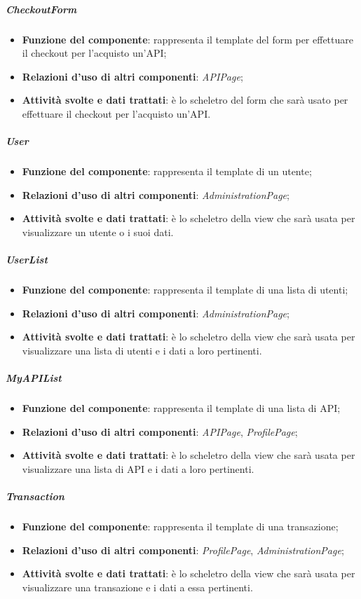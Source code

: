 \subparagraph{CheckoutForm}
\begin{itemize}
	\item \textbf{Funzione del componente}: rappresenta il template del form per effettuare il checkout per l'acquisto un'API;
	\item \textbf{Relazioni d’uso di altri componenti}: \textit{APIPage};
	\item \textbf{Attività svolte e dati trattati}: \`{e} lo scheletro del form che sar\`{a} usato per effettuare il checkout per l'acquisto un'API.
\end{itemize}

\subparagraph{User}
\begin{itemize}
	\item \textbf{Funzione del componente}: rappresenta il template di un utente;
	\item \textbf{Relazioni d’uso di altri componenti}: \textit{AdministrationPage};
	\item \textbf{Attività svolte e dati trattati}: \`{e} lo scheletro della view che sar\`{a} usata per visualizzare un utente o i suoi dati.
\end{itemize}

\subparagraph{UserList}
\begin{itemize}
	\item \textbf{Funzione del componente}: rappresenta il template di una lista di utenti;
	\item \textbf{Relazioni d’uso di altri componenti}: \textit{AdministrationPage};
	\item \textbf{Attività svolte e dati trattati}: \`{e} lo scheletro della view che sar\`{a} usata per visualizzare una lista di utenti e i dati a loro pertinenti.
\end{itemize}

\subparagraph{MyAPIList}
\begin{itemize}
	\item \textbf{Funzione del componente}: rappresenta il template di una lista di API;
	\item \textbf{Relazioni d’uso di altri componenti}: \textit{APIPage}, \textit{ProfilePage};
	\item \textbf{Attività svolte e dati trattati}: \`{e} lo scheletro della view che sar\`{a} usata per visualizzare una lista di API e i dati a loro pertinenti.
\end{itemize}

\subparagraph{Transaction}
\begin{itemize}
	\item \textbf{Funzione del componente}: rappresenta il template di una transazione;
	\item \textbf{Relazioni d’uso di altri componenti}: \textit{ProfilePage}, \textit{AdministrationPage};
	\item \textbf{Attività svolte e dati trattati}: \`{e} lo scheletro della view che sar\`{a} usata per visualizzare una transazione e i dati a essa pertinenti.
\end{itemize}

